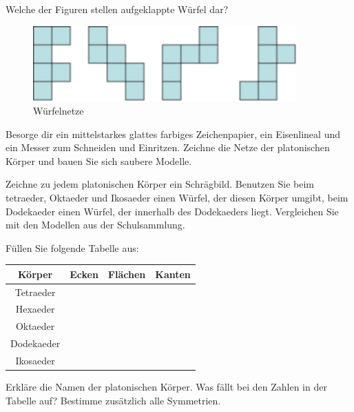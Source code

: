 \documentclass[%
11pt,%
twoside,%
titlepage,%
a4page,%
german,%
headsepline%
]{scrartcl}
\newcommand{\spaltenheight}{\rule{0mm}{3ex}}
\newcommand{\spaltensep}{\\[1ex]}
\begin{document}
\begin{ueb}
Welche der Figuren stellen aufgeklappte W\"urfel dar?
\begin{figure}[h!]
\begin{center}
\includegraphics[width=0.9\textwidth]{pictures/wuerfelnetz}
\end{center}
\caption{W\"urfelnetze}
\end{figure}
\end{ueb}

\begin{ueb}
Besorge dir ein mittelstarkes glattes farbiges Zeichenpapier, ein Eisenlineal und ein Messer zum Schneiden und Einritzen. Zeichne die Netze der platonischen K\"orper und bauen Sie sich saubere Modelle.
\end{ueb}

\begin{ueb}
Zeichne zu jedem platonischen K\"orper ein Schr\"agbild. Benutzen Sie beim tetraeder, Oktaeder und Ikosaeder einen W\"urfel, der diesen K\"orper umgibt, beim Dodekaeder einen W\"urfel, der innerhalb des Dodekaeders liegt. Vergleichen Sie mit den Modellen aus der Schulsammlung.
\end{ueb}

\begin{ueb}
F\"ullen Sie folgende Tabelle aus:
\begin{center}
\begin{tabular}{|c|c|c|c|}\hline
\spaltenheight\textbf{K\"orper} & \textbf{Ecken} & \textbf{Fl\"achen} & \textbf{Kanten}\spaltensep \hline
\spaltenheight Tetraeder & & & \spaltensep \hline
\spaltenheight Hexaeder & & & \spaltensep \hline
\spaltenheight Oktaeder & & & \spaltensep \hline
\spaltenheight Dodekaeder & & & \spaltensep \hline
\spaltenheight Ikosaeder & & & \spaltensep \hline
\end{tabular}
\end{center}
Erkl\"are die Namen der platonischen K\"orper. Was f\"allt bei den Zahlen in der Tabelle auf? Bestimme zus\"atzlich alle Symmetrien.
\end{ueb}
\end{document}
